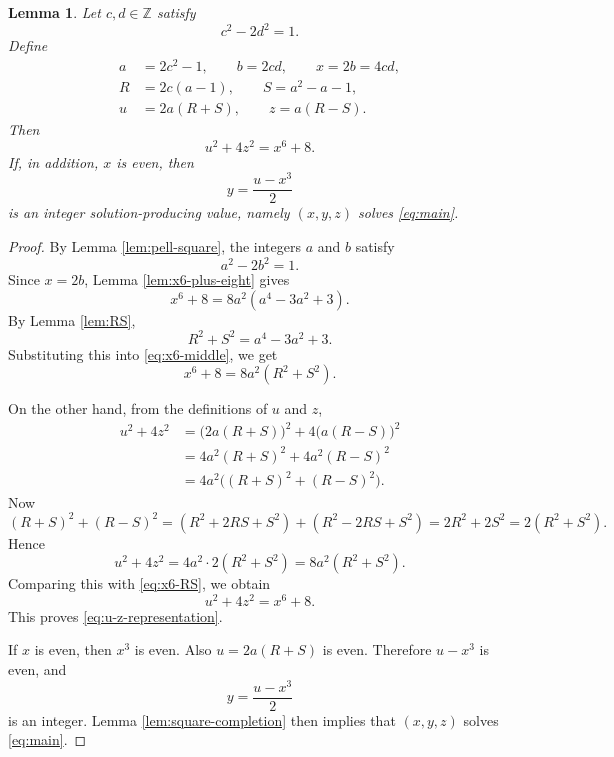 \documentclass[11pt]{article}
\numberwithin{equation}{section}
\newtheorem{lemma}[theorem]{Lemma}
\theoremstyle{remark}
\begin{document}
\begin{lemma}\label{lem:representation-lemma}
Let \(c,d\in\mathbb Z\) satisfy
\[
    c^2-2d^2=1.
\]
Define
\begin{equation}\label{eq:construction-general}
\begin{aligned}
    a&=2c^2-1,\qquad b=2cd,\qquad x=2b=4cd,\\
    R&=2c(a-1),\qquad S=a^2-a-1,\\
    u&=2a(R+S),\qquad z=a(R-S).
\end{aligned}
\end{equation}
Then
\begin{equation}\label{eq:u-z-representation}
    u^2+4z^2=x^6+8.
\end{equation}
If, in addition, \(x\) is even, then
\[
    y=\frac{u-x^3}{2}
\]
is an integer solution-producing value, namely \((x,y,z)\) solves \eqref{eq:main}.
\end{lemma}

\begin{proof}
By Lemma \ref{lem:pell-square}, the integers \(a\) and \(b\) satisfy
\[
    a^2-2b^2=1.
\]
Since \(x=2b\), Lemma \ref{lem:x6-plus-eight} gives
\begin{equation}\label{eq:x6-middle}
    x^6+8=8a^2(a^4-3a^2+3).
\end{equation}
By Lemma \ref{lem:RS},
\[
    R^2+S^2=a^4-3a^2+3.
\]
Substituting this into \eqref{eq:x6-middle}, we get
\begin{equation}\label{eq:x6-RS}
    x^6+8=8a^2(R^2+S^2).
\end{equation}

On the other hand, from the definitions of \(u\) and \(z\),
\begin{align*}
    u^2+4z^2
    &=\bigl(2a(R+S)\bigr)^2+4\bigl(a(R-S)\bigr)^2\\
    &=4a^2(R+S)^2+4a^2(R-S)^2\\
    &=4a^2\bigl((R+S)^2+(R-S)^2\bigr).
\end{align*}
Now
\[
    (R+S)^2+(R-S)^2
    =(R^2+2RS+S^2)+(R^2-2RS+S^2)
    =2R^2+2S^2
    =2(R^2+S^2).
\]
Hence
\[
    u^2+4z^2=4a^2\cdot 2(R^2+S^2)=8a^2(R^2+S^2).
\]
Comparing this with \eqref{eq:x6-RS}, we obtain
\[
    u^2+4z^2=x^6+8.
\]
This proves \eqref{eq:u-z-representation}.

If \(x\) is even, then \(x^3\) is even.  Also \(u=2a(R+S)\) is even.  Therefore \(u-x^3\) is even, and
\[
    y=\frac{u-x^3}{2}
\]
is an integer.  Lemma \ref{lem:square-completion} then implies that \((x,y,z)\) solves \eqref{eq:main}.
\end{proof}
\end{document}
